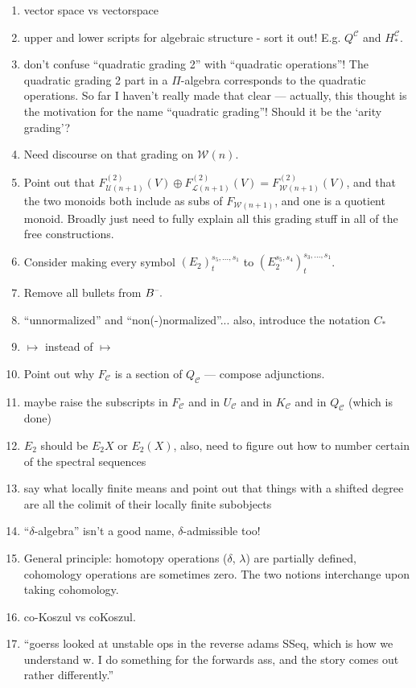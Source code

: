 \documentclass[11pt]{amsart}
\theoremstyle{plain}
\theoremstyle{definition}
\newcommand{\DASH}{\textup{--}}
\newcommand{\calW}{\mathcal{W}}
\newcommand{\calU}{\mathcal{U}}
\newcommand{\calL}{\mathcal{L}}
\newcommand{\calC}{\mathcal{C}}
\theoremstyle{plain}
\begin{document}
\begin{todolist}
\begin{enumerate}
\item vector space vs vectorspace
\item upper and lower scripts for algebraic structure - sort it out! E.g. $Q^\calC$ and $H_*^\calC$.
\item don't confuse ``quadratic grading 2'' with ``quadratic operations''! The quadratic grading 2 part in a $\Pi$-algebra corresponds to the quadratic operations. So far I haven't really made that clear --- actually, this thought is the motivation for the name ``quadratic grading''! Should it be the `arity grading'?
\item Need discourse on that grading on $\calW(n)$.
\item Point out that $F_{\calU(n+1)}^{(2)}(V)\oplus F_{\calL(n+1)}^{(2)}(V)=F_{\calW(n+1)}^{(2)}(V)$, and that the two monoids both include as subs of $F_{\calW(n+1)}$, and one is a quotient monoid. Broadly just need to fully explain all this grading stuff in all of the free constructions.
\item Consider making every symbol $(E_2)^{s_5,\ldots,s_1}_t$ to $(E_2^{s_5,s_4})^{s_3,\ldots,s_1}_t$.
\item Remove all bullets from $B^{\DASH}.$
\item ``unnormalized'' and ``non(-)normalized''... also, introduce the notation $C_*$
\item $\longmapsto$ instead of $\mapsto$
\item Point out why $F_\calC$ is a section of $Q_{\calC}$ --- compose adjunctions.
\item maybe raise the subscripts in $F_\calC$ and in $U_\calC$ and in $K_\calC$ and in $Q_\calC$ (which is done)
\item $E_2$ should be $E_2X$ or $E_2(X)$, also, need to figure out how to number certain of the spectral sequences
\item say what locally finite means and point out that things with a shifted degree are all the colimit of their locally finite subobjects
\item ``$\delta$-algebra'' isn't a good name, $\delta$-admissible too!
\item General principle: homotopy operations ($\delta$, $\lambda$) are partially defined, cohomology operations are sometimes zero. The two notions interchange upon taking cohomology.
\item co-Koszul vs coKoszul.
\item ``goerss looked at unstable ops in the reverse adams SSeq, which is how we understand w. I do something for the forwards ass, and the story comes out rather differently.''

\end{enumerate}
\end{todolist}
\end{document}
